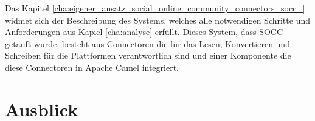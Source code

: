 Das Kapitel \ref{cha:eigener_ansatz_social_online_community_connectors_socc_} widmet sich der Beschreibung des Systems, welches alle notwendigen Schritte und Anforderungen aus Kapiel \ref{cha:analyse} erfüllt. Dieses System, dass SOCC getauft wurde, besteht aus Connectoren die für das Lesen, Konvertieren und Schreiben für die Plattformen verantwortlich sind und einer Komponente die diese Connectoren in Apache Camel integriert. 


\section{Ausblick} %
\label{sec:ausblick}


